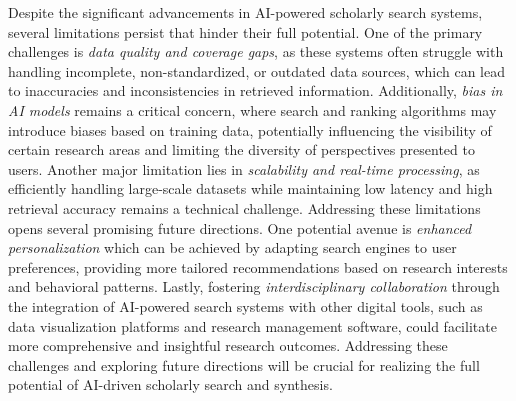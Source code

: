 
Despite the significant advancements in AI-powered scholarly search systems, several limitations persist that hinder their full potential. One of the primary challenges is \textit{data quality and coverage gaps}, as these systems often struggle with handling incomplete, non-standardized, or outdated data sources, which can lead to inaccuracies and inconsistencies in retrieved information. Additionally, \textit{bias in AI models} remains a critical concern, where search and ranking algorithms may introduce biases based on training data, potentially influencing the visibility of certain research areas and limiting the diversity of perspectives presented to users. Another major limitation lies in \textit{scalability and real-time processing}, as efficiently handling large-scale datasets while maintaining low latency and high retrieval accuracy remains a technical challenge. Addressing these limitations opens several promising future directions. One potential avenue is \textit{enhanced personalization} which can be achieved by adapting search engines to user preferences, providing more tailored recommendations based on research interests and behavioral patterns. Lastly, fostering \textit{interdisciplinary collaboration} through the integration of AI-powered search systems with other digital tools, such as data visualization platforms and research management software, could facilitate more comprehensive and insightful research outcomes. Addressing these challenges and exploring future directions will be crucial for realizing the full potential of AI-driven scholarly search and synthesis. 


